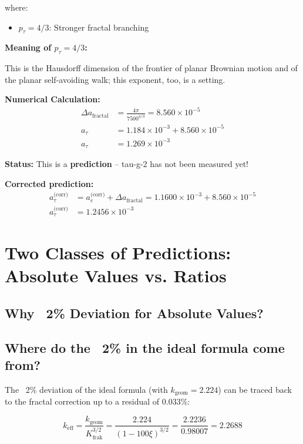 	where:
	\begin{itemize}
		\item $p_\tau = 4/3$: Stronger fractal branching
	\end{itemize}
	
	\textbf{Meaning of $p_\tau = 4/3$:}
	
	This is the Hausdorff dimension of the frontier of planar Brownian motion and of the planar self-avoiding walk; this exponent, too, is a setting.
	
	\textbf{Numerical Calculation:}
	\begin{align}
		\Delta a_{\text{fractal}} &= \frac{4\pi}{7500^{4/3}} = 8.560 \times 10^{-5} \\
		a_\tau &= 1.184 \times 10^{-3} + 8.560 \times 10^{-5} \\
		a_\tau &= 1.269 \times 10^{-3}
	\end{align}
	
	\textbf{Status:} This is a \textbf{prediction} – tau-g-2 has not been measured yet!
	
	\textbf{Corrected prediction:}
	\begin{align}
		a_\tau^\text{(corr)} &= a_e^\text{(corr)} + \Delta a_\text{fractal} = 1.1600 \times 10^{-3} + 8.560 \times 10^{-5} \\
		a_\tau^\text{(corr)} &= 1.2456 \times 10^{-3}
	\end{align}
	
	\section{Two Classes of Predictions: Absolute Values vs. Ratios}
	
	\subsection{Why ~2\% Deviation for Absolute Values?}
	
	\subsection{Where do the ~2\% in the ideal formula come from?}
	
	The ~2\% deviation of the ideal formula (with $k_\text{geom} = 2.224$) can be traced back to the fractal correction up to a residual of 0.033\%:
	
	\begin{equation}
		k_\text{eff} = \frac{k_\text{geom}}{K_\text{frak}^{3/2}} = \frac{2.224}{(1-100\xi)^{3/2}} = \frac{2.2236}{0.98007} = 2.2688
	\end{equation}
	
